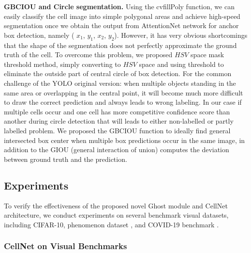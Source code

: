 \textbf{GBCIOU and Circle segmentation.} Using the cvfillPoly function, we can easily classify the cell image into simple polygonal areas and achieve high-speed segmentation once we obtain the output from AttentionNet network for anchor box detection, namely ( $x_{1}$, $y_{1}$, $x_{2}$, $y_{2}$). However, it has very obvious shortcomings that the shape of the segmentation does not perfectly approximate the ground truth of the cell. To overcome this problem, we proposed $HSV$ space mask threshold method, simply converting to $HSV$ space and using threshold to eliminate the outside part of central circle of box detection.  For the common challenge of the YOLO original version: when multiple objects standing in the same area or overlapping in the central point, it will become much more difficult to draw the correct prediction and always leads to wrong labeling. In our case if multiple cells occur and one cell has more competitive confidence score than another during circle detection that will leads to either non-labelled or partly labelled problem.
We proposed the GBCIOU function to ideally find general intersected box center when multiple box predictions occur in the same image, in addition to the GIOU (general interaction of union) computes the deviation between ground truth and the prediction.



\subsection{Experiments}
To verify the effectiveness of the proposed novel Ghost module and CellNet architecture, we conduct experiments on several benchmark visual datasets, including CIFAR-10\cite{b21}, phenomenon dataset \cite{b38}, and COVID-19 benchmark \cite{b36}\cite{b37}. 


\subsubsection{CellNet on Visual Benchmarks}




